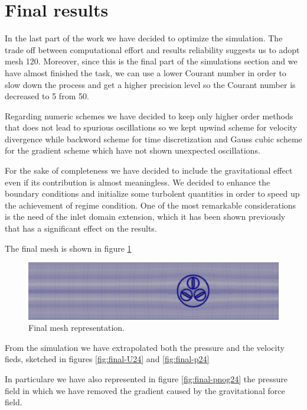 \documentclass[a4paper,12pt]{article}
\begin{document}
\section{Final results}

In the last part of the work we have decided to optimize the simulation. The trade off between computational effort and results reliability suggests us to adopt mesh 120. 
Moreover, since this is the final part of the simulations section and we have almost finished the task, 
we can use a lower Courant number in order to slow down the process and get a higher precision level so the Courant number is decreased to 5 from 50. 


Regarding numeric schemes we have decided to keep only higher order methods that does not lead to spurious oscillations so we kept upwind scheme for velocity divergence while backword scheme for time discretization and Gauss cubic scheme for the gradient scheme which have not shown unexpected oscillations.

For the sake of completeness we have decided to include the gravitational effect even if its contribution is almost meaningless. 
We decided to enhance the boundary conditions and initialize some turbolent quantities in order to speed up the achievement of regime condition. 
One of the most remarkable considerations is the need of the inlet domain extension, which it has been shown previously that has a significant effect on the results.

The final mesh is shown in figure \ref{fig:final-mesh}

\begin{figure}[H]
\centering
\includegraphics[width=\textwidth]{images/final/mesh120.png}
\caption{Final mesh representation.}
\label{fig:final-mesh}
\end{figure}

From the simulation we have extrapolated both the pressure and the velocity fieds, sketched in figures \ref{fig:final-U24} and \ref{fig:final-p24}

In particulare we have also represented in figure \ref{fig:final-pnog24} the pressure field in which we have removed the gradient caused by the gravitational force field.
\end{document}

